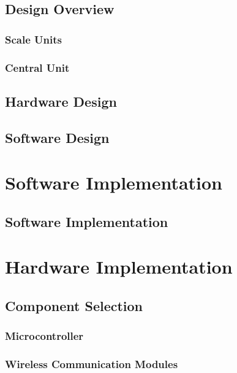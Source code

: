 \documentclass{l3proj}
\begin{document}
\section{Design Overview}

\subsection{Scale Units}
\label{scale}

\subsection{Central Unit}
\label{central}


\label{Block Diagram}
\section{Hardware Design}


\section{Software Design}

\chapter{Software Implementation}
\label{impl}
\section{Software Implementation}

\chapter{Hardware Implementation}

\section{Component Selection}
\subsection{Microcontroller}

\subsection{Wireless Communication Modules}

\end{document}
